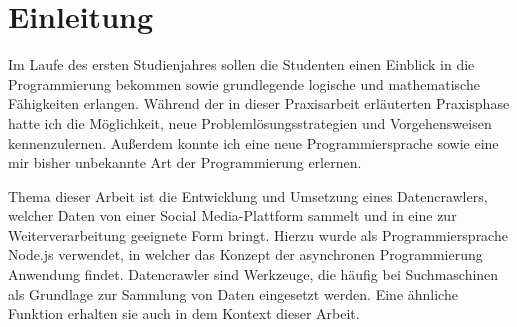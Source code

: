 
\chapter{Einleitung}
\large
Im Laufe des ersten Studienjahres sollen die Studenten einen Einblick in die Programmierung bekommen sowie grundlegende logische und mathematische Fähigkeiten erlangen. Während der in dieser Praxisarbeit erläuterten Praxisphase hatte ich die Möglichkeit, neue Problemlösungsstrategien und Vorgehensweisen kennenzulernen. Außerdem konnte ich eine neue Programmiersprache sowie eine mir bisher unbekannte Art der Programmierung erlernen.

Thema dieser Arbeit ist die Entwicklung und Umsetzung eines Datencrawlers, welcher Daten von einer Social Media-Plattform sammelt und in eine zur Weiterverarbeitung geeignete Form bringt. Hierzu wurde als Programmiersprache Node.js verwendet, in welcher das Konzept der asynchronen Programmierung Anwendung findet. 
Datencrawler sind Werkzeuge, die häufig bei Suchmaschinen als Grundlage zur Sammlung von Daten eingesetzt werden. Eine ähnliche Funktion erhalten sie auch in dem Kontext dieser Arbeit.


